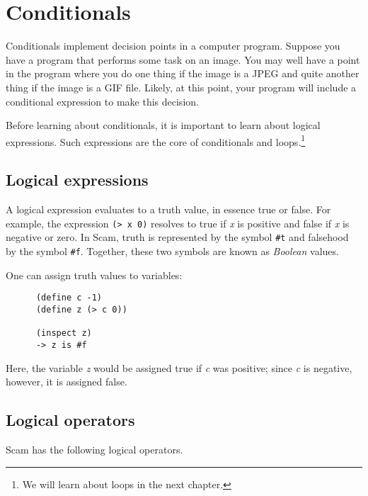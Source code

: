 \chapter{Conditionals}
\label{Conditionals}

Conditionals implement decision points in a computer program.
Suppose you have a program that performs some task on an
image. You may well have a point in the program where you
do one thing if the image is a JPEG and quite another
thing if the image is a GIF file. Likely, at this point,
your program will include a conditional expression to make
this decision.

Before learning about conditionals, it is important to
learn about logical expressions. Such expressions are the
core of conditionals and loops.\footnote{
We will learn about loops in the next chapter.
}

\section{Logical expressions}

A logical expression evaluates to a truth value, in essence true or
false. For example, the expression \verb!(> x 0)!
resolves to true if {\it x} is positive
and false if {\it x} is negative or zero. In Scam, truth is represented by
the symbol \verb!#t! and falsehood
by the symbol \verb!#f!.
Together,
these two symbols are known as {\it {\sc Boolean}} values.

One can assign truth values to variables:

\begin{verbatim}
      (define c -1)
      (define z (> c 0))

      (inspect z)
      -> z is #f
\end{verbatim}

Here, the variable {\it z} would be assigned true
if {\it c}  was positive;
since {\it c} is negative, however, it is assigned false.

\section{Logical operators}

Scam has the following logical operators.
 
